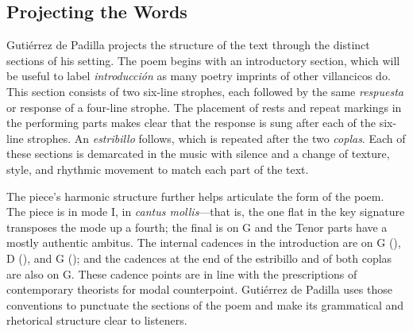 \subsection{Projecting the Words}

Gutiérrez de Padilla projects the structure of the text through the distinct
sections of his setting.
The poem begins with an introductory section, which will be useful to label
\emph{introducción} as many poetry imprints of other villancicos do.
This section consists of two six-line strophes, each followed by the same
\emph{respuesta} or response of a four-line strophe.
The placement of rests and repeat markings in the performing parts makes clear
that the response is sung after each of the six-line strophes.
An \emph{estribillo} follows, which is repeated after the two \emph{coplas}.
Each of these sections is demarcated in the music with silence and a change of
texture, style, and rhythmic movement to match each part of the text.

The piece's harmonic structure further helps articulate the form of the poem.
The piece is in mode I, in \emph{cantus mollis}---that is, the one flat in the
key signature transposes the mode up a fourth; the final is on G and the Tenor
parts have a mostly authentic ambitus.
The internal cadences in the introduction are on G (), D
(), and G (); and the cadences at the end of the
estribillo and of both coplas are also on G.
These cadence points are in line with the prescriptions of contemporary
theorists for modal counterpoint.%
    \Autocites
    [873--882, 883--885, 907--912]{Cerone:Melopeo}
    [364--406]{Judd:RenaissanceModalTheory}
    {Barnett:TonalOrganization17C}
Gutiérrez de Padilla uses those conventions to punctuate the sections of the
poem and make its grammatical and rhetorical structure clear to listeners.

